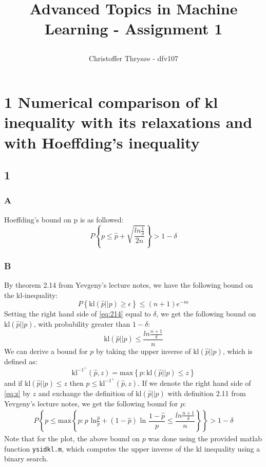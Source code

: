 \documentclass{article}
\title{
\vspace{1in}
\textmd{\textbf{Advanced Topics in Machine Learning - Assignment 1}} \\
\author{Christoffer Thrysøe - dfv107}
}
\begin{document}
\maketitle
{}
\section{1 Numerical comparison of kl inequality with its relaxations
and with Hoeffding’s inequality}
\subsection{1}
\subsubsection*{A}
Hoeffding’s bound on p is as followed:
\begin{equation*}
P \left\lbrace p \leq \hat{p} + \sqrt{ \dfrac{ln \frac{1}{\delta}}{2n}} \right\rbrace > 1 - \delta
\end{equation*}
\subsubsection{B}
By theorem 2.14 from Yevgeny's lecture notes, we have the following bound on the kl-inequality:
\begin{equation}
\label{eq:214}
P \left\lbrace \text{kl}(\hat{p} || p) \geq \epsilon \right\rbrace \leq (n+1) e^{-n\epsilon}
\end{equation}
Setting the right hand side of \eqref{eq:214} equal to $\delta$, we get the following bound on $\text{kl}(\hat{p}||p)$, with probability greater than $1- \delta$:
\begin{equation}
\label{eq:z}
\text{kl}(\hat{p} || p) \leq \dfrac{ln \frac{n+1}{\delta}}{n}
\end{equation}
We can derive a bound for $p$ by taking the upper inverse of $\text{kl}(\hat{p}||p)$, which is defined as:
\begin{equation}
\text{kl}^{-1^+}(\hat{p},z) = \text{max} \left\lbrace p: \text{kl}(\hat{p}||p) \leq z \right\rbrace
\end{equation}
and if $\text{kl}(\hat{p}||p) \leq z$ then $p \leq \text{kl}^{-1^+}(\hat{p},z)$. If we denote the right hand side of \eqref{eq:z} by $z$ and exchange the definition of $\text{kl}(\hat{p}||p)$ with definition 2.11 from Yevgeny's lecture notes, we get the following bound for $p$:
\begin{align*}
P \left\lbrace p \leq \text{max} \left\lbrace p: p \text{ ln} \frac{\hat{p}}{p} + (1-\hat{p}) \text{ ln } \dfrac{1-\hat{p}}{p} \leq \dfrac{ln \frac{n+1}{\delta}}{n} \right\rbrace \right \rbrace > 1 - \delta
\end{align*}
Note that for the plot, the above bound on $p$ was done using the provided matlab function \texttt{ysidkl.m}, which computes the upper inverse of the kl inequality using a binary search.
\end{document}
